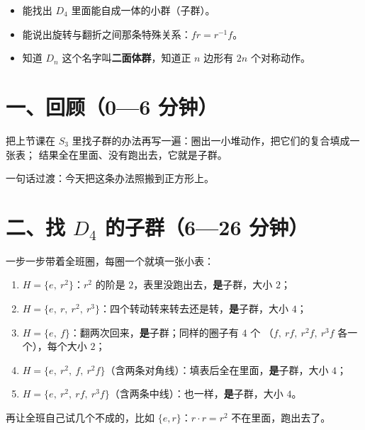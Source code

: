 

\begin{mubiao}
  \begin{itemize}
    \item 能找出 \(D_4\) 里面能自成一体的小群（子群）。
    \item 能说出旋转与翻折之间那条特殊关系：\(fr=r^{-1}f\)。
    \item 知道 \(D_n\) 这个名字叫\textbf{二面体群}，知道正 \(n\) 边形有 \(2n\) 个对称动作。
  \end{itemize}
\end{mubiao}


\section*{一、回顾（0—6 分钟）}

把上节课在 \(S_3\) 里找子群的办法再写一遍：圈出一小堆动作，把它们的复合填成一张表；
结果全在里面、没有跑出去，它就是子群。

一句话过渡：今天把这条办法照搬到正方形上。

\section*{二、找 \(D_4\) 的子群（6—26 分钟）}

\begin{caozuo}
  一步一步带着全班圈，每圈一个就填一张小表：
  \begin{enumerate}
    \item \(H=\{e,\ r^2\}\)：\(r^2\) 的阶是 \(2\)，表里没跑出去，\textbf{是}子群，大小 \(2\)；
    \item \(H=\{e,\ r,\ r^2,\ r^3\}\)：四个转动转来转去还是转，\textbf{是}子群，大小 \(4\)；
    \item \(H=\{e,\ f\}\)：翻两次回来，\textbf{是}子群；同样的圈子有 \(4\) 个
      （\(f,\ rf,\ r^2f,\ r^3f\) 各一个），每个大小 \(2\)；
    \item \(H=\{e,\ r^2,\ f,\ r^2f\}\)（含两条对角线）：填表后全在里面，\textbf{是}子群，大小 \(4\)；
    \item \(H=\{e,\ r^2,\ rf,\ r^3f\}\)（含两条中线）：也一样，\textbf{是}子群，大小 \(4\)。
  \end{enumerate}
  再让全班自己试几个不成的，比如 \(\{e,r\}\)：\(r\cdot r=r^2\) 不在里面，跑出去了。
\end{caozuo}

